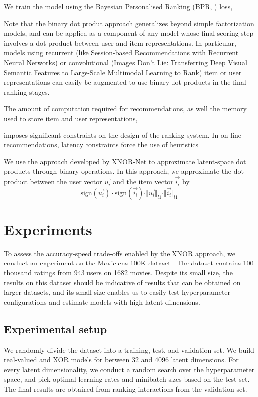 \documentclass[sigconf]{acmart}
\begin{document}

We train the model using the Bayesian Personalised Ranking (BPR, \cite{rendle2009bpr}) loss,


Note that the binary dot produt approach generalizes beyond simple factorization models, and can be applied as a component of any model whose final scoring step involves a dot product between user and item representations. In particular, models using recurrent (like Session-based Recommendations with Recurrent Neural Networks) or convolutional (Images Don’t Lie: Transferring Deep Visual Semantic
Features to Large-Scale Multimodal Learning to Rank) item or user representations can easily be augmented to use binary dot products in the final ranking stages.


The amount of computation required for recommendations, as well the memory used to store item and user representations, 

 imposes significant constraints on the design of the ranking system. In on-line recommendations, latency constraints force the use of heuristics 


We use the approach developed by XNOR-Net to approximate latent-space dot products through binary operations. In this approach, we approximate the dot product between the user vector $\vec{u_i}$ and the item vector $\vec{i_i}$ by
\begin{equation}
\mathrm{sign}(\vec{u_i}) \cdot \mathrm{sign}(\vec{i_i}) \cdot \Vert\vec{u_i}\Vert_{l1} \cdot \Vert\vec{i_i}\Vert_{l1}
\end{equation}



\section{Experiments}
To assess the accuracy-speed trade-offs enabled by the XNOR approach, we conduct an experiment on the Movielens 100K dataset \citep{harper2016movielens}. The dataset contains 100 thousand ratings from 943 users on 1682 movies. Despite its small size, the results on this dataset should be indicative of results that can be obtained on larger datasets, and its small size enables us to easily test hyperparameter configurations and estimate models with high latent dimensions.

\subsection{Experimental setup}
We randomly divide the dataset into a training, test, and validation set. We build real-valued and XOR models for between 32 and 4096 latent dimensions. For every latent dimensionality, we conduct a random search over the hyperparameter space, and pick optimal learning rates and minibatch sizes based on the test set. The final results are obtained from ranking interactions from the validation set.
\end{document}
